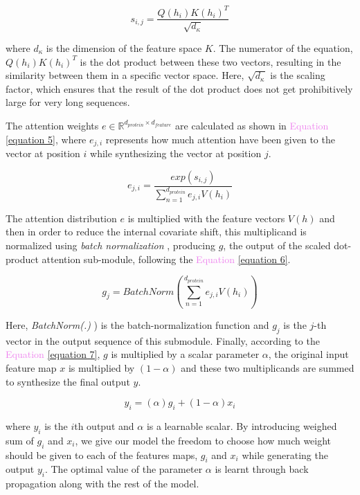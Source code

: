 \documentclass[11 pt, a4paper]{article}
\begin{document}
\begin{multicols}{2}
\begin{equation}
    s_{i,j} = \frac{Q(h_i)K(h_i)^T}{\sqrt{d_\kappa}}
    \label{equation 4}
\end{equation}

where $d_\kappa$ is the dimension of the feature space $K$. The numerator of
the equation, $Q(h_i)K(h_i)^T$ is the dot product between these two vectors,
resulting in the similarity between them in a specific vector space. Here, 
$\sqrt{d_\kappa}$ is the scaling factor, which ensures that the result
of the dot product does not get prohibitively large for very long 
sequences.\par
The attention weights $e \in \mathbb{R}^{d_{protein} \times d_{feature}}$
are calculated as shown in \textcolor{violet}{Equation} \ref{equation 5},
where $e_{j,i}$ represents how much attention have been given to the vector
at position $i$ while synthesizing the vector at position $j$.

\begin{equation}
    e_{j,i} = \frac{exp(s_{i,j})}{\sum_{n = 1}^{d_{protein}} e_{j,i}V(h_i)}
    \label{equation 5}
\end{equation}

The attention distribution $e$ is multiplied with the feature
vectors $V(h)$ and then in order to reduce the internal covariate 
shift, this multiplicand is normalized using \textit{batch
normalization} \cite{Ioffe},  producing $g$, the output of the 
scaled dot-product attention sub-module, following the
\textcolor{violet}{Equation} \ref{equation 6}.

\begin{equation}
    g_j = BatchNorm(\sum_{n = 1}^{d_{protein}} e_{j,i}V(h_i))
    \label{equation 6}
\end{equation}

Here, \textit{BatchNorm(.)} ) is the batch-normalization function
and $g_j$ is the $j$-th vector in the output sequence of this
submodule. Finally, according to the \textcolor{violet}{Equation}
\ref{equation 7}, $g$ is multiplied by a scalar parameter
$\alpha$, the original input feature map $x$ is multiplied by 
$(1-\alpha)$ and these two multiplicands are summed to synthesize
the final output $y$.

\begin{equation}
    y_i = (\alpha)g_i + (1-\alpha)x_i
    \label{equation 7}
\end{equation}

where $y_i$ is the $i$th output and $\alpha$ is a learnable
scalar. By introducing weighed sum of $g_i$ and $x_i$, we give
our model the freedom to choose how much weight should be given
to each of the features maps, $g_i$ and $x_i$ while generating 
the output $y_i$. The optimal value of the parameter $\alpha$ is
learnt through back propagation along with the rest of the model.

\end{multicols}
\end{document}
